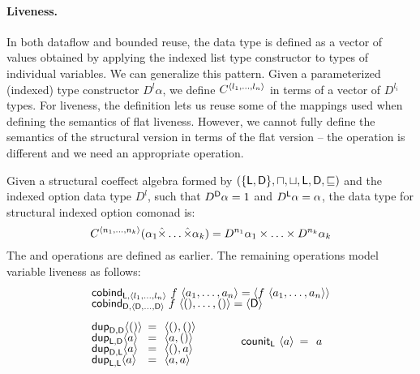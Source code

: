 \paragraph{Liveness.}
In both dataflow and bounded reuse, the data type is defined as a vector of values obtained
by applying the indexed list type constructor to types of individual variables. We can
generalize this pattern. Given a parameterized (indexed) type constructor $D^l \alpha$, we define
$\ctyp{\langle l_1, \ldots, l_n \rangle}$ in terms of a vector of $D^{l_i}$ types.
For liveness, the definition lets us reuse some of the mappings used when defining the semantics of
flat liveness. However, we cannot fully define the semantics of the structural version in terms of
the flat version -- the  operation is different and we need an appropriate
 operation.

\begin{example}
\label{thm:struct-live}
Given a structural coeffect algebra formed by $(\{ \textnormal{\sffamily L}, \textnormal{\sffamily D} \}, \sqcap, \sqcup, \textnormal{\sffamily L}, \textnormal{\sffamily D}, \sqsubseteq)$
and the indexed option data type $D^l$, such that $D^{\textnormal{\sffamily D}}\alpha = 1$ and $D^{\textnormal{\sffamily L}}\alpha=\alpha$,
the data type for structural indexed option comonad is:
%
\begin{equation*}
C^{\langle n_1, \ldots, n_k\rangle}(\alpha_1 \hat{\times} \ldots \hat{\times} \alpha_k) =
  D^{n_1} \alpha_1 \times \ldots \times D^{n_k} \alpha_k
\end{equation*}
%
The  and  operations are defined as earlier. The remaining operations
model variable liveness as follows:
%
\begin{equation*}
\begin{array}{l}
\ident{cobind}_{\ident{L}, \langle l_1, \ldots, l_n \rangle}~f~\langle a_1, \ldots, a_n \rangle = \langle f~\langle a_1, \ldots, a_n \rangle \rangle \\[-0.25em]
\ident{cobind}_{\ident{D}, \langle \ident{D}, \ldots, \ident{D} \rangle}~f~\langle (), \ldots, () \rangle = \langle \ident{D} \rangle
\\[0.5em]
\hspace{-0.5em}
\begin{array}{lll}
~\\[-0.85em]
\ident{dup}_{\ident{D}, \ident{D}} \langle () \rangle &\narrow{=}& \langle (), () \rangle \\[-0.25em]
\ident{dup}_{\ident{L}, \ident{D}} \langle a \rangle &\narrow{=}& \langle a, () \rangle \\[-0.25em]
\ident{dup}_{\ident{D}, \ident{L}} \langle a \rangle &\narrow{=}& \langle (), a \rangle \\[-0.25em]
\ident{dup}_{\ident{L}, \ident{L}} \langle a \rangle &\narrow{=}& \langle a, a \rangle
\end{array}
\qquad\quad
\begin{array}{lll}
\ident{counit}_{\ident{L}}~\langle a \rangle &\narrow{=}& a
\end{array}
\end{array}
\end{equation*}
\end{example}

